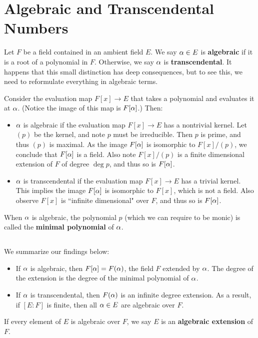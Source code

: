 \section{Algebraic and Transcendental Numbers}
Let $F$ be a field contained in an ambient field $E$. We say $\alpha \in E$ is \textbf{algebraic} if it is a root of a polynomial in $F$. Otherwise, we say $\alpha$ is \textbf{transcendental}. It happens that this small distinction has deep consequences, but to see this, we need to reformulate everything in algebraic terms.

Consider the evaluation map $F[x] \rightarrow E$ that takes a polynomial and evaluates it at $\alpha$. (Notice the image of this map is $F[\alpha]$.) Then:
\begin{itemize}
    \item $\alpha$ is algebraic if the evaluation map $F[x] \rightarrow E$ has a nontrivial kernel. Let $(p)$ be the kernel, and note $p$ must be irreducible. Then $p$ is prime, and thus $(p)$ is maximal. As the image $F[\alpha]$ is isomorphic to $F[x]/(p)$, we conclude that $F[\alpha]$ is a field. Also note $F[x]/(p)$ is a finite dimensional extension of $F$ of degree $\deg p$, and thus so is $F[\alpha]$.
    \item $\alpha$ is transcendental if the evaluation map $F[x] \rightarrow E$ has a trivial kernel. This implies the image $F[\alpha]$ is isomorphic to $F[x]$, which is not a field. Also observe $F[x]$ is ``infinite dimensional" over $F$, and thus so is $F[\alpha]$.
\end{itemize}
When $\alpha$ is algebraic, the polynomial $p$ (which we can require to be monic) is called the \textbf{minimal polynomial} of $\alpha$.

\subsection{}
We summarize our findings below:
\begin{itemize}
    \item If $\alpha$ is algebraic, then $F[\alpha] = F(\alpha)$, the field $F$ extended by $\alpha$. The degree of the extension is the degree of the minimal polynomial of $\alpha$.
    \item If $\alpha$ is transcendental, then $F(\alpha)$ is an infinite degree extension. As a result, if $[E : F]$ is finite, then all $\alpha \in E$ are algebraic over $F$.
\end{itemize}
If every element of $E$ is algebraic over $F$, we say $E$ is an \textbf{algebraic extension} of $F$.
